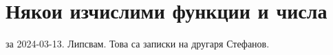 \section{Някои изчислими функции и числа}
за 2024-03-13. Липсвам. Това са записки на другаря Стефанов.
